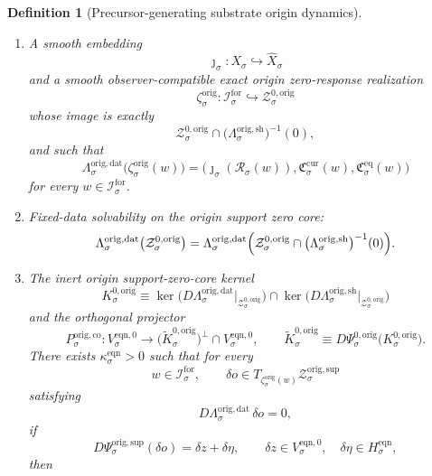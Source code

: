 \documentclass[11pt]{article}
\newcommand{\ForSpace}[1]{\mathcal I_{#1}^{\mathrm{for}}}
\newcommand{\Reduction}[1]{\mathcal R_{#1}}
\newcommand{\CurrentCarrier}[1]{\mathfrak C_{#1}^{\mathrm{cur}}}
\newcommand{\EqCarrier}[1]{\mathfrak C_{#1}^{\mathrm{eq}}}
\newcommand{\VisibleAffine}[1]{\widehat X_{#1}}
\newcommand{\EqnHidden}[1]{H_{#1}^{\mathrm{eqn}}}
\newcommand{\EqnZero}[1]{V_{#1}^{\mathrm{eqn},0}}
\newcommand{\OrigData}[1]{\Lambda_{#1}^{\mathrm{orig,dat}}}
\newcommand{\OrigShellMap}[1]{\Lambda_{#1}^{\mathrm{orig,sh}}}
\newcommand{\OrigSupportShell}[1]{\mathcal Z_{#1}^{\mathrm{orig,sup}}}
\newcommand{\OrigZeroCore}[1]{\mathcal Z_{#1}^{0,\mathrm{orig}}}
\newcommand{\OrigEqChart}[1]{\Psi_{#1}^{\mathrm{orig,sup}}}
\newcommand{\OrigZeroChart}[1]{\Psi_{#1}^{0,\mathrm{orig}}}
\newcommand{\OrigSplit}[1]{\Phi_{#1}^{\mathrm{orig}}}
\newcommand{\OrigCharge}[1]{\mathcal Q_{#1}^{\mathrm{orig}}}
\newcommand{\OrigResidual}[1]{\mathcal R_{#1}^{\mathrm{orig}}}
\newcommand{\OrigEmbed}[1]{\zeta_{#1}^{\mathrm{orig}}}
\newcommand{\OrigKernel}[1]{K_{#1}^{0,\mathrm{orig}}}
\newcommand{\OrigKernelCh}[1]{\widetilde K_{#1}^{0,\mathrm{orig}}}
\newcommand{\OrigStateComp}[1]{P_{#1}^{\mathrm{orig,co}}}
\newtheorem{definition}{Definition}
\begin{document}
\begin{definition}[Precursor-generating substrate origin dynamics]
\begin{enumerate}
    Define the origin support-shell hidden recorder by
    \begin{equation}
    \OrigResidual{\sigma}\bigl(\OrigSplit{\sigma}(z,\eta)\bigr)
    \equiv
    \OrigCharge{\sigma}(\eta).
    \label{eq:origresidual}
    \end{equation}
    \item A smooth embedding
    \[
    \jmath_{\sigma}:X_{\sigma}\hookrightarrow\VisibleAffine{\sigma}
    \]
    and a smooth observer-compatible exact origin zero-response realization
    \[
    \OrigEmbed{\sigma}:\ForSpace{\sigma}\hookrightarrow\OrigZeroCore{\sigma}
    \]
    whose image is exactly
    \[
    \OrigZeroCore{\sigma}
    \cap
    \bigl(\OrigShellMap{\sigma}\bigr)^{-1}(0),
    \]
    and such that
    \begin{equation}
    \OrigData{\sigma}\bigl(\OrigEmbed{\sigma}(w)\bigr)
    =
    \bigl(
    \jmath_{\sigma}(\Reduction{\sigma}(w)),
    \CurrentCarrier{\sigma}(w),
    \EqCarrier{\sigma}(w)
    \bigr)
    \label{eq:origcompat}
    \end{equation}
    for every \(w\in\ForSpace{\sigma}\).
    \item Fixed-data solvability on the origin support zero core:
    \begin{equation}
    \OrigData{\sigma}\bigl(\OrigZeroCore{\sigma}\bigr)
    =
    \OrigData{\sigma}\Bigl(
    \OrigZeroCore{\sigma}\cap
    \bigl(\OrigShellMap{\sigma}\bigr)^{-1}(0)
    \Bigr).
    \label{eq:origsolvability}
    \end{equation}
    \item The inert origin support-zero-core kernel
    \[
    \OrigKernel{\sigma}
    \equiv
    \ker\bigl(D\OrigData{\sigma}\big|_{\OrigZeroCore{\sigma}}\bigr)
    \cap
    \ker\bigl(D\OrigShellMap{\sigma}\big|_{\OrigZeroCore{\sigma}}\bigr)
    \]
    and the orthogonal projector
    \[
    \OrigStateComp{\sigma}:
    \EqnZero{\sigma}\to
    \bigl(\OrigKernelCh{\sigma}\bigr)^{\perp}\cap\EqnZero{\sigma},
    \qquad
    \OrigKernelCh{\sigma}
    \equiv
    D\OrigZeroChart{\sigma}\bigl(\OrigKernel{\sigma}\bigr).
    \]
    There exists \(\kappa_{\sigma}^{\mathrm{eqn}}>0\) such that for every
    \[
    w\in\ForSpace{\sigma},
    \qquad
    \delta o\in T_{\OrigEmbed{\sigma}(w)}\OrigSupportShell{\sigma}
    \]
    satisfying
    \[
    D\OrigData{\sigma}\,\delta o=0,
    \]
    if
    \[
    D\OrigEqChart{\sigma}(\delta o)=\delta z+\delta\eta,
    \qquad
    \delta z\in\EqnZero{\sigma},
    \quad
    \delta\eta\in\EqnHidden{\sigma},
    \]
    then
    \begin{equation}

\end{equation}
\end{enumerate}
\end{definition}
\end{document}
